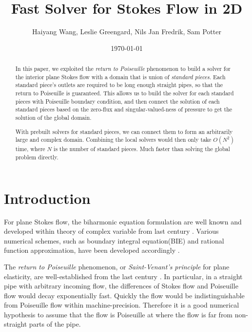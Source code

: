 \documentclass[10pt,twocolumn]{article}
\author{Haiyang Wang, Leslie Greengard, Nils Jan Fredrik, Sam Potter}
\date{\today}
\title{Fast Solver for Stokes Flow in 2D}
\newtheorem[L]{thm}{Theorem}[section]
\begin{document}
\maketitle

\begin{abstract}
  In this paper, we exploited the \textit{return to Poiseuille} phenomenon to build a solver for the interior plane Stokes flow with a domain that is union of \textit{standard pieces}. 
  Each standard piece's outlets are required to be long enough straight pipes, so that the return to Poiseuille is guaranteed. 
  This allows us to build the solver for each standard pieces with Poiseuille boundary condition, 
  and then connect the solution of each standard pieces based on the zero-flux 
  and singular-valued-ness of pressure to get the solution of the global domain. 

  With prebuilt solvers for standard pieces, we can connect them to form an arbitrarily large and complex domain. 
  Combining the local solvers would then only take $O(N^2)$ time, where $N$ is the number of standard pieces. 
  Much faster than solving the global problem directly.
\end{abstract}

\section{Introduction}

For plane Stokes flow, the biharmonic equation formulation are well known 
and developed within theory of complex variable from last century \cite{ladyzhenskayaMathematicalTheoryViscous1964}.
Various numerical schemes, such as boundary integral equation(BIE) and rational function approximation, 
have been developed accordingly \cite{greengardIntegralEquationMethods1996,trefethenApproximationTheoryApproximation2019}. 


The \textit{return to Poiseuille} phenomenon, or \textit{Saint-Venant's principle} for plane elasticity, are well-established 
from the last century \cite{coRecentDevelopmentsConcerning1983,gregoryTractionBoundaryValue1980,horganDECAYESTIMATESBIHARMONIC1989}. 
In particular, in a straight pipe with arbitrary incoming flow, the differences of Stokes flow and Poiseuille flow would decay exponentially fast. 
Quickly the flow would be indistinguishable from Poiseuille flow within machine-precision. 
Therefore it is a good numerical hypothesis to assume that the flow is Poiseuille at where the flow is far from non-straight parts 
of the pipe.
\end{document}
